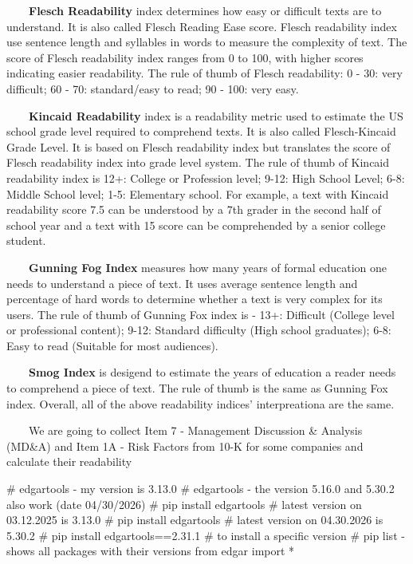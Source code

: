 \documentclass[
  letterpaper,
  DIV=11,
  numbers=noendperiod]{scrreprt}
\newenvironment{Shaded}{\begin{snugshade}}{\end{snugshade}}
\newcommand{\CommentTok}[1]{\textcolor[rgb]{0.37,0.37,0.37}{#1}}
\newcommand{\ImportTok}[1]{\textcolor[rgb]{0.00,0.46,0.62}{#1}}
\newcommand{\NormalTok}[1]{\textcolor[rgb]{0.00,0.23,0.31}{#1}}
\newcommand{\OperatorTok}[1]{\textcolor[rgb]{0.37,0.37,0.37}{#1}}
\begin{document}
~~~~\textbf{Flesch Readability} index determines how easy or difficult
texts are to understand. It is also called Flesch Reading Ease score.
Flesch readability index use sentence length and syllables in words to
measure the complexity of text. The score of Flesch readability index
ranges from 0 to 100, with higher scores indicating easier readability.
The rule of thumb of Flesch readability: 0 - 30: very difficult; 60 -
70: standard/easy to read; 90 - 100: very easy.

~~~~\textbf{Kincaid Readability} index is a readability metric used to
estimate the US school grade level required to comprehend texts. It is
also called Flesch-Kincaid Grade Level. It is based on Flesch
readability index but translates the score of Flesch readability index
into grade level system. The rule of thumb of Kincaid readability index
is 12+: College or Profession level; 9-12: High School Level; 6-8:
Middle School level; 1-5: Elementary school. For example, a text with
Kincaid readability score 7.5 can be understood by a 7th grader in the
second half of school year and a text with 15 score can be comprehended
by a senior college student.

~~~~\textbf{Gunning Fog Index} measures how many years of formal
education one needs to understand a piece of text. It uses average
sentence length and percentage of hard words to determine whether a text
is very complex for its users. The rule of thumb of Gunning Fox index is
- 13+: Difficult (College level or professional content); 9-12: Standard
difficulty (High school graduates); 6-8: Easy to read (Suitable for most
audiences).

~~~~\textbf{Smog Index} is desigend to estimate the years of education a
reader needs to comprehend a piece of text. The rule of thumb is the
same as Gunning Fox index. Overall, all of the above readability
indices' interpreationa are the same.

~~~~We are going to collect Item 7 - Management Discussion \& Analysis
(MD\&A) and Item 1A - Risk Factors from 10-K for some companies and
calculate their readability

\begin{Shaded}
\begin{Highlighting}[]
\CommentTok{\# edgartools {-} my version is 3.13.0}
\CommentTok{\# edgartools {-} the version 5.16.0 and 5.30.2 also work (date 04/30/2026)}
\CommentTok{\# pip install edgartools \# latest version on 03.12.2025 is 3.13.0}
\CommentTok{\# pip install edgartools \# latest version on 04.30.2026 is 5.30.2}
\CommentTok{\# pip install edgartools==2.31.1 \# to install a specific version}
\CommentTok{\# pip list {-} shows all packages with their versions }
\ImportTok{from}\NormalTok{ edgar }\ImportTok{import} \OperatorTok{*}
\end{Highlighting}
\end{Shaded}
\end{document}
